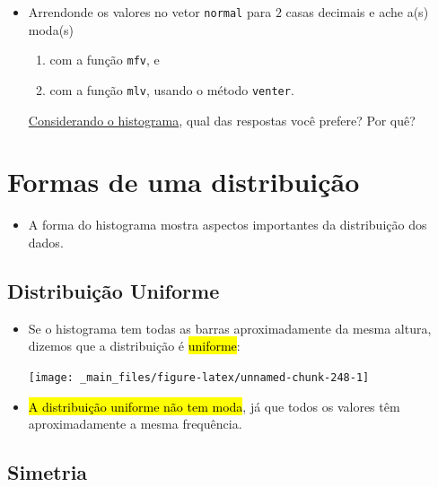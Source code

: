 \documentclass[
  11pt]{report}
\providecommand{\tightlist}{%
  \setlength{\itemsep}{0pt}\setlength{\parskip}{0pt}}
\begin{document}
\begin{itemize}
\item
  Arrendonde os valores no vetor \texttt{normal} para $2$ casas decimais e ache a(s) moda(s)

  \begin{enumerate}
  \def\labelenumi{\arabic{enumi}.}
  \item
    com a função \texttt{mfv}, e
  \item
    com a função \texttt{mlv}, usando o método \texttt{venter}.
  \end{enumerate}

  \protect\hyperlink{dados-normais}{Considerando o histograma}, qual das respostas você prefere? Por quê?
\end{itemize}

\hypertarget{formas-de-uma-distribuiuxe7uxe3o}{%
\section{Formas de uma distribuição}\label{formas-de-uma-distribuiuxe7uxe3o}}

\begin{itemize}
\tightlist
\item
  A forma do histograma mostra aspectos importantes da distribuição dos dados.
\end{itemize}

\hypertarget{distribuiuxe7uxe3o-uniforme}{%
\subsection{Distribuição Uniforme}\label{distribuiuxe7uxe3o-uniforme}}

\begin{itemize}
\item
  Se o histograma tem todas as barras aproximadamente da mesma altura, dizemos que a distribuição é {\hl{uniforme}}:

  \begin{center}\texttt{[image: \_main\_files/figure-latex/unnamed-chunk-248-1]} \end{center}
\item
  {\hl{A distribuição uniforme não tem moda}}, já que todos os valores têm aproximadamente a mesma frequência.
\end{itemize}

\hypertarget{simetria}{%
\subsection{Simetria}\label{simetria}}
\end{document}

